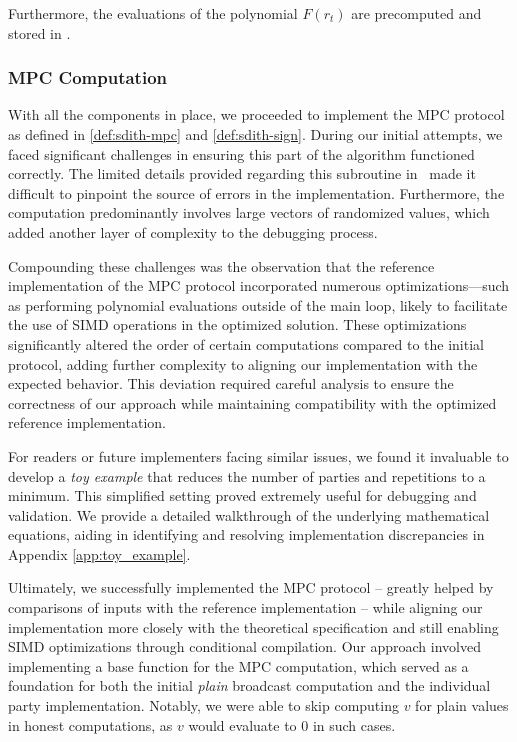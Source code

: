 \documentclass[11pt]{report}
\theoremstyle{definition}
\theoremstyle{plain}
\begin{document}
Furthermore, the evaluations of the polynomial $F(r_t)$ are precomputed and stored in .

\subsubsection{MPC Computation}

With all the components in place, we proceeded to implement the MPC protocol as defined in \autoref{def:sdith-mpc} and \autoref{def:sdith-sign}. During our initial attempts, we faced significant challenges in ensuring this part of the algorithm functioned correctly. The limited details provided regarding this subroutine in~\cite{aguilarsyndrome11} made it difficult to pinpoint the source of errors in the implementation. Furthermore, the computation predominantly involves large vectors of randomized values, which added another layer of complexity to the debugging process.

Compounding these challenges was the observation that the reference implementation of the MPC protocol incorporated numerous optimizations—such as performing polynomial evaluations outside of the main loop, likely to facilitate the use of SIMD operations in the optimized solution. These optimizations significantly altered the order of certain computations compared to the initial protocol, adding further complexity to aligning our implementation with the expected behavior. This deviation required careful analysis to ensure the correctness of our approach while maintaining compatibility with the optimized reference implementation.

For readers or future implementers facing similar issues, we found it invaluable to develop a \textit{toy example} that reduces the number of parties and repetitions to a minimum. This simplified setting proved extremely useful for debugging and validation. We provide a detailed walkthrough of the underlying mathematical equations, aiding in identifying and resolving implementation discrepancies in Appendix \ref{app:toy_example}.

Ultimately, we successfully implemented the MPC protocol -- greatly helped by comparisons of inputs with the reference implementation -- while aligning our implementation more closely with the theoretical specification and still enabling SIMD optimizations through conditional compilation. Our approach involved implementing a base function for the MPC computation, which served as a foundation for both the initial \textit{plain} broadcast computation and the individual party implementation. Notably, we were able to skip computing $v$ for plain values in honest computations, as $v$ would evaluate to $0$ in such cases.
\end{document}
